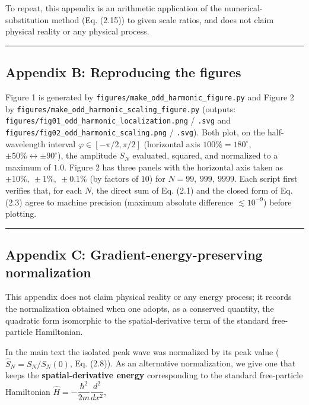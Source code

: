\documentclass[
]{ltjsarticle}
\begin{document}
To repeat, this appendix is an arithmetic application of the
numerical-substitution method (Eq. (2.15)) to given scale ratios, and
does not claim physical reality or any physical process.

\begin{center}\rule{0.5\linewidth}{0.5pt}\end{center}

\subsection{Appendix B: Reproducing the
figures}\label{appendix-b-reproducing-the-figures}

Figure 1 is generated by \texttt{figures/make\_odd\_harmonic\_figure.py}
and Figure 2 by \texttt{figures/make\_odd\_harmonic\_scaling\_figure.py}
(outputs: \texttt{figures/fig01\_odd\_harmonic\_localization.png} /
\texttt{.svg} and \texttt{figures/fig02\_odd\_harmonic\_scaling.png} /
\texttt{.svg}). Both plot, on the half-wavelength interval
\(\varphi\in[-\pi/2,\pi/2]\) (horizontal axis \(100\%=180^\circ\),
\(\pm50\%\leftrightarrow\pm90^\circ\)), the amplitude \(S_N\) evaluated,
squared, and normalized to a maximum of \(1.0\). Figure 2 has three
panels with the horizontal axis taken as \(\pm10\%,\ \pm1\%,\ \pm0.1\%\)
(by factors of \(10\)) for \(N=99,\ 999,\ 9999\). Each script first
verifies that, for each \(N\), the direct sum of Eq. (2.1) and the
closed form of Eq. (2.3) agree to machine precision (maximum absolute
difference \(\lesssim 10^{-9}\)) before plotting.

\begin{center}\rule{0.5\linewidth}{0.5pt}\end{center}

\subsection{Appendix C: Gradient-energy-preserving
normalization}\label{appendix-c-gradient-energy-preserving-normalization}

This appendix does not claim physical reality or any energy process; it
records the normalization obtained when one adopts, as a conserved
quantity, the quadratic form isomorphic to the spatial-derivative term
of the standard free-particle Hamiltonian.

In the main text the isolated peak wave was normalized by its peak value
(\(\widehat{S}_N=S_N/S_N(0)\), Eq. (2.8)). As an alternative
normalization, we give one that keeps the \textbf{spatial-derivative
energy} corresponding to the standard free-particle Hamiltonian
\(\hat H=-\dfrac{\hbar^2}{2m}\dfrac{d^2}{dx^2}\),
\end{document}
